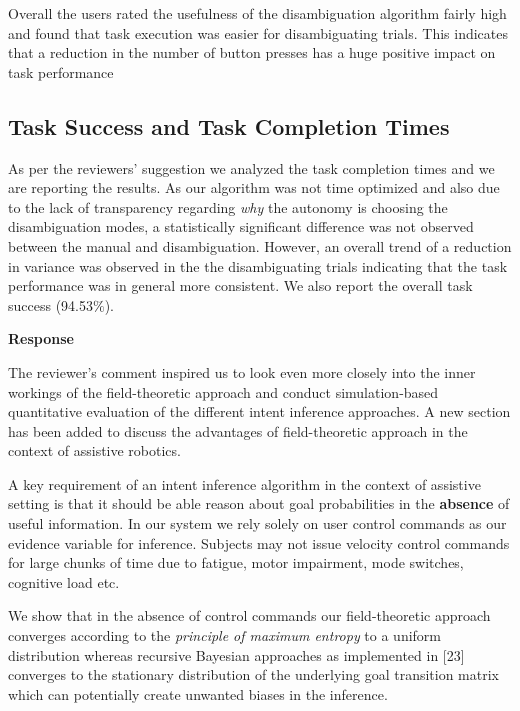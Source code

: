 \documentclass[a4paper,twoside,11pt]{reviewresponse}
\begin{document}
Overall the users rated the usefulness of the disambiguation algorithm fairly high and found that task execution was easier for disambiguating trials. This indicates that a reduction in the number of button presses has a huge positive impact on task performance


\subsection{Task Success and Task Completion Times}
As per the reviewers' suggestion we analyzed the task completion times and we are reporting the results. As our algorithm was not time optimized and also due to the lack of transparency regarding \textit{why} the autonomy is choosing the disambiguation modes, a statistically significant difference was not observed between the manual and disambiguation. However, an overall trend of a reduction in variance was observed in the the disambiguating trials indicating that the task performance was in general more consistent. We also report the overall task success (94.53$\%$). 


\textbf{Response}

The reviewer's comment inspired us to look even more closely into the inner workings of the field-theoretic approach and conduct simulation-based quantitative evaluation of the different intent inference approaches. 
A new section has been added to discuss the advantages of field-theoretic approach in the context of assistive robotics. 

A key requirement of an intent inference algorithm in the context of assistive setting is that it should be able reason about goal probabilities in the \textbf{absence} of useful information. In our system we rely solely on user control commands as our evidence variable for inference. Subjects may not issue velocity control commands for large chunks of time due to fatigue, motor impairment, mode switches, cognitive load etc. 

We show that in the absence of control commands our field-theoretic approach converges according to the \textit{principle of maximum entropy} to a uniform distribution whereas recursive Bayesian approaches as implemented in [23] converges to the stationary distribution of the underlying goal transition matrix which can potentially create unwanted biases in the inference. 
\end{document}
